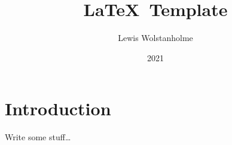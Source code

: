 
\title{
    \vspace{-36px}
    \LaTeX~Template                             %
}
\author{
    \normalsize{Lewis Wolstanholme}             %
}
\date{
    2021                                        %
}




\maketitle


\section*{Introduction}

Write some stuff\ldots

\pagebreak

